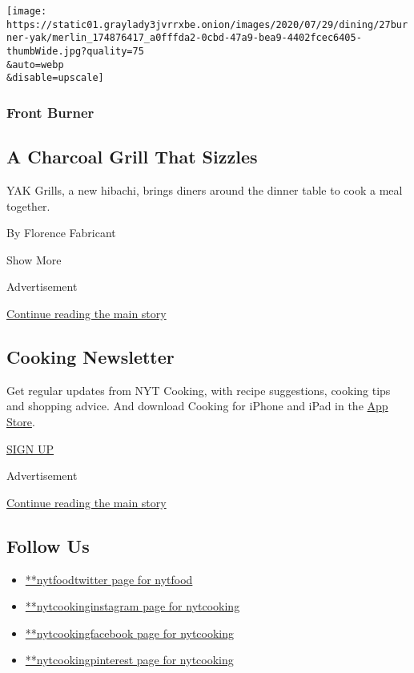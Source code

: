 \begin{enumerate}
  \texttt{[image: https://static01.graylady3jvrrxbe.onion/images/2020/07/29/dining/27burner-yak/merlin\_174876417\_a0fffda2-0cbd-47a9-bea9-4402fcec6405-thumbWide.jpg?quality=75\\\&auto=webp\\\&disable=upscale]}

  \hypertarget{front-burner-5}{%
  \subsubsection{Front Burner}\label{front-burner-5}}

  \hypertarget{a-charcoal-grill-that-sizzles}{%
  \subsection{A Charcoal Grill That
  Sizzles}\label{a-charcoal-grill-that-sizzles}}

  YAK Grills, a new hibachi, brings diners around the dinner table to
  cook a meal together.

  By Florence Fabricant
\end{enumerate}

Show More

Advertisement

\protect\hyperlink{after-mid2}{Continue reading the main story}

\hypertarget{cooking-newsletter}{%
\subsection{Cooking Newsletter}\label{cooking-newsletter}}

Get regular updates from NYT Cooking, with recipe suggestions, cooking
tips and shopping advice. And download Cooking for iPhone and iPad in
the
\href{https://itunes.apple.com/us/app/nyt-cooking-recipes-from-new/id911422904?mt=8}{App
Store}.

\href{/newsletters/signup/CK}{SIGN UP}

Advertisement

\protect\hyperlink{after-mktg}{Continue reading the main story}

\hypertarget{follow-us}{%
\subsection{Follow Us}\label{follow-us}}

\begin{itemize}
\tightlist
\item
  \href{https://twitter.com/nytfood}{**nytfoodtwitter page for nytfood}
\item
  \href{https://instagram.com/nytcooking}{**nytcookinginstagram page for
  nytcooking}
\item
  \href{https://www.facebookcorewwwi.onion/nytcooking}{**nytcookingfacebook
  page for nytcooking}
\item
  \href{https://pinterest.com/nytcooking}{**nytcookingpinterest page for
  nytcooking}
\end{itemize}

